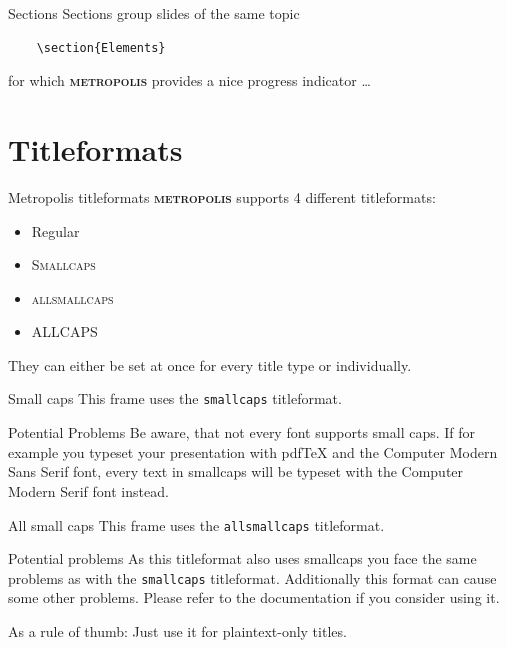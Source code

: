 \documentclass[aspectratio=169,10pt]{beamer}
\newcommand{\themename}{\textbf{\textsc{metropolis}}\xspace}
\begin{document}
\begin{frame}[fragile]{Sections}
  Sections group slides of the same topic

  \begin{verbatim}    \section{Elements}\end{verbatim}

  for which \themename provides a nice progress indicator \ldots
\end{frame}

\section{Titleformats}

\begin{frame}{Metropolis titleformats}
  \themename supports 4 different titleformats:
  \begin{itemize}
    \item Regular
    \item \textsc{Smallcaps}
    \item \textsc{allsmallcaps}
    \item ALLCAPS
  \end{itemize}
  They can either be set at once for every title type or individually.
\end{frame}

{
\begin{frame}{Small caps}
  This frame uses the \texttt{smallcaps} titleformat.

  \begin{alertblock}{Potential Problems}
    Be aware, that not every font supports small caps. If for example you typeset your presentation with pdfTeX and the Computer Modern Sans Serif font, every text in smallcaps will be typeset with the Computer Modern Serif font instead.
  \end{alertblock}
\end{frame}
}

{
\begin{frame}{All small caps}
  This frame uses the \texttt{allsmallcaps} titleformat.

  \begin{alertblock}{Potential problems}
    As this titleformat also uses smallcaps you face the same problems as with the \texttt{smallcaps} titleformat. Additionally this format can cause some other problems. Please refer to the documentation if you consider using it.

    As a rule of thumb: Just use it for plaintext-only titles.
  \end{alertblock}
\end{frame}
}
\end{document}
